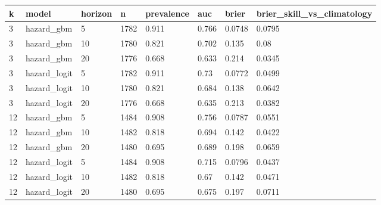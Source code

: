 \begin{tabular}{llllllll}
\toprule
k & model & horizon & n & prevalence & auc & brier & brier\_skill\_vs\_climatology \\
\midrule
3 & hazard\_gbm & 5 & 1782 & 0.911 & 0.766 & 0.0748 & 0.0795 \\
3 & hazard\_gbm & 10 & 1780 & 0.821 & 0.702 & 0.135 & 0.08 \\
3 & hazard\_gbm & 20 & 1776 & 0.668 & 0.633 & 0.214 & 0.0345 \\
3 & hazard\_logit & 5 & 1782 & 0.911 & 0.73 & 0.0772 & 0.0499 \\
3 & hazard\_logit & 10 & 1780 & 0.821 & 0.684 & 0.138 & 0.0642 \\
3 & hazard\_logit & 20 & 1776 & 0.668 & 0.635 & 0.213 & 0.0382 \\
12 & hazard\_gbm & 5 & 1484 & 0.908 & 0.756 & 0.0787 & 0.0551 \\
12 & hazard\_gbm & 10 & 1482 & 0.818 & 0.694 & 0.142 & 0.0422 \\
12 & hazard\_gbm & 20 & 1480 & 0.695 & 0.689 & 0.198 & 0.0659 \\
12 & hazard\_logit & 5 & 1484 & 0.908 & 0.715 & 0.0796 & 0.0437 \\
12 & hazard\_logit & 10 & 1482 & 0.818 & 0.67 & 0.142 & 0.0471 \\
12 & hazard\_logit & 20 & 1480 & 0.695 & 0.675 & 0.197 & 0.0711 \\
\bottomrule
\end{tabular}